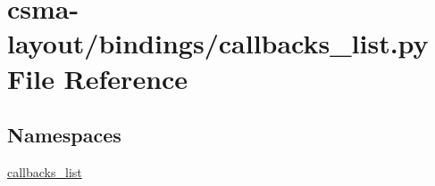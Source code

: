 \hypertarget{csma-layout_2bindings_2callbacks__list_8py}{}\section{csma-\/layout/bindings/callbacks\+\_\+list.py File Reference}
\label{csma-layout_2bindings_2callbacks__list_8py}
\subsection*{Namespaces}
\begin{DoxyCompactItemize}
\item 
 \hyperlink{namespacecallbacks__list}{callbacks\+\_\+list}
\end{DoxyCompactItemize}
